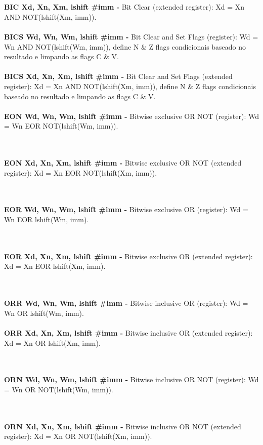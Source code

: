 \documentclass[12pt,a4paper,utf8]{ppgsi}
\begin{document}
\\\\\textbf{BIC Xd, Xn, Xm{, lshift \#imm} -} Bit Clear (extended register): Xd = Xn AND NOT(lshift(Xm, imm)). 
\\\\\textbf{BICS Wd, Wn, Wm{, lshift \#imm} -} Bit Clear and Set Flags (register): Wd = Wn AND NOT(lshift(Wm, imm)), define N \& Z flags condicionais
baseado no resultado e limpando as flags C \& V. 
\\\\\textbf{BICS Xd, Xn, Xm{, lshift \#imm} -} Bit Clear and Set Flags (extended register): Xd = Xn AND NOT(lshift(Xm, imm)), define N \& Z flags condicionais
baseado no resultado e limpando as flags C \& V. 
\\\\\textbf{EON Wd, Wn, Wm{, lshift \#imm} -} Bitwise exclusive OR NOT (register): Wd = Wn EOR NOT(lshift(Wm, imm)). 

\\\\\textbf{EON Xd, Xn, Xm{, lshift \#imm} -} Bitwise exclusive OR NOT (extended register): Xd = Xn EOR NOT(lshift(Xm, imm)). 

\\\\\textbf{EOR Wd, Wn, Wm{, lshift \#imm} -} Bitwise exclusive OR (register): Wd = Wn EOR lshift(Wm, imm). 

\\\\\textbf{EOR Xd, Xn, Xm{, lshift \#imm} -} Bitwise exclusive OR (extended register): Xd = Xn EOR lshift(Xm, imm). 

\\\\\textbf{ORR Wd, Wn, Wm{, lshift \#imm} -} Bitwise inclusive OR (register): Wd = Wn OR lshift(Wm, imm). 
\\\\\textbf{ORR Xd, Xn, Xm{, lshift \#imm} -} Bitwise inclusive OR (extended register): Xd = Xn OR lshift(Xm, imm). 

\\\\\textbf{ORN Wd, Wn, Wm{, lshift \#imm} -} Bitwise inclusive OR NOT (register): Wd = Wn OR NOT(lshift(Wm, imm)). 

\\\\\textbf{ORN Xd, Xn, Xm{, lshift \#imm} -} Bitwise inclusive OR NOT (extended register): Xd = Xn OR NOT(lshift(Xm, imm)). 
\end{document}
